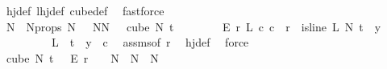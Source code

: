 \begin{isabellebody}
\ hj{\isacharunderscore}{\kern0pt}def\ lhj{\isacharunderscore}{\kern0pt}def\ cube{\isacharunderscore}{\kern0pt}def\ \isamarkupfalse%
\ fastforce\isanewline
\ \ \ \ \ \ \isamarkupfalse%
\isanewline
\ \ \ \ \ \ \ \ \isamarkupfalse%
\ {}\isanewline
\ \ \ \ \ \ \ \ \isamarkupfalse%
\ \isamarkupfalse%
\ N\ \ N{\isacharunderscore}{\kern0pt}props{\isacharcolon}{\kern0pt}\ {\isachardoublequoteopen}N\ {\isachargreater}{\kern0pt}\ {}{\isachardoublequoteclose}\ {\isachardoublequoteopen}{\isasymforall}N{\isacharprime}{\kern0pt}{\isasymge}N{\isachardot}{\kern0pt}\ {\isasymforall}{\isasymchi}\ {\isasymin}\ cube\ N{\isacharprime}{\kern0pt}\ t\isanewline
\ \ \ \ \ \ \ \ {\isasymrightarrow}\isactrlsub E\ {\isacharbraceleft}{\kern0pt}{\isachardot}{\kern0pt}{\isachardot}{\kern0pt}{\isacharless}{\kern0pt}r{\isacharbraceright}{\kern0pt}{\isachardot}{\kern0pt}\ {\isacharparenleft}{\kern0pt}{\isasymexists}L\ c{\isachardot}{\kern0pt}\ c\ {\isacharless}{\kern0pt}\ r\ {\isasymand}\ is{\isacharunderscore}{\kern0pt}line\ L\ N{\isacharprime}{\kern0pt}\ t\ {\isasymand}\ {\isacharparenleft}{\kern0pt}{\isasymforall}y\isanewline
\ \ \ \ \ \ \ \ {\isasymin}\ L\ {\isacharbackquote}{\kern0pt}\ {\isacharbraceleft}{\kern0pt}{\isachardot}{\kern0pt}{\isachardot}{\kern0pt}{\isacharless}{\kern0pt}t{\isacharbraceright}{\kern0pt}{\isachardot}{\kern0pt}\ {\isasymchi}\ y\ {\isacharequal}{\kern0pt}\ c{\isacharparenright}{\kern0pt}{\isacharparenright}{\kern0pt}{\isachardoublequoteclose}\ \isamarkupfalse%
\ assms{\isacharbrackleft}{\kern0pt}of\ r{\isacharbrackright}{\kern0pt}\ \isamarkupfalse%
\ hj{\isacharunderscore}{\kern0pt}def\ \isamarkupfalse%
\ force\isanewline
\ \ \ \ \ \ \ \ \isamarkupfalse%
\ {\isachardoublequoteopen}cube\ N{\isacharprime}{\kern0pt}\ {\isacharparenleft}{\kern0pt}t\ {\isacharplus}{\kern0pt}\ {}{\isacharparenright}{\kern0pt}\ {\isasymrightarrow}\isactrlsub E\ {\isacharbraceleft}{\kern0pt}{\isachardot}{\kern0pt}{\isachardot}{\kern0pt}{\isacharless}{\kern0pt}r{\isacharbraceright}{\kern0pt}\ {\isacharequal}{\kern0pt}\ {\isacharbraceleft}{\kern0pt}{\isacharbraceright}{\kern0pt}{\isachardoublequoteclose}\ \ {\isachardoublequoteopen}N{\isacharprime}{\kern0pt}\ {\isasymge}\ N{\isachardoublequoteclose}\ \ N{\isacharprime}{\kern0pt}\isanewline
\ \ \ \ \ \ \ \ \isamarkupfalse%
{\isacharminus}{\kern0pt}\isanewline
\ \ \ \ \ \ \ \ \ \ \isamarkupfalse%

\end{isabellebody}
